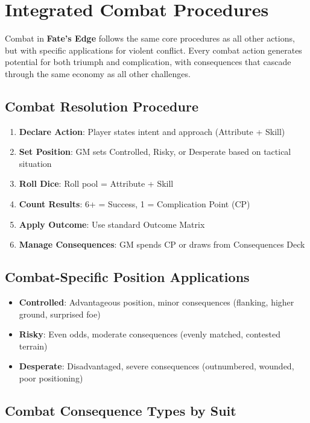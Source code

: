 \section*{Integrated Combat Procedures}

Combat in \textbf{Fate's Edge} follows the same core procedures as all other actions, but with specific applications for violent conflict. Every combat action generates potential for both triumph and complication, with consequences that cascade through the same economy as all other challenges.

\subsection*{Combat Resolution Procedure}

\begin{enumerate}
    \item \textbf{Declare Action}: Player states intent and approach (Attribute + Skill)
    \item \textbf{Set Position}: GM sets Controlled, Risky, or Desperate based on tactical situation
    \item \textbf{Roll Dice}: Roll pool = Attribute + Skill
    \item \textbf{Count Results}: 6+ = Success, 1 = Complication Point (CP)
    \item \textbf{Apply Outcome}: Use standard Outcome Matrix
    \item \textbf{Manage Consequences}: GM spends CP or draws from Consequences Deck
\end{enumerate}

\subsection*{Combat-Specific Position Applications}

\begin{itemize}
    \item \textbf{Controlled}: Advantageous position, minor consequences (flanking, higher ground, surprised foe)
    \item \textbf{Risky}: Even odds, moderate consequences (evenly matched, contested terrain)
    \item \textbf{Desperate}: Disadvantaged, severe consequences (outnumbered, wounded, poor positioning)
\end{itemize}

\subsection*{Combat Consequence Types by Suit}

